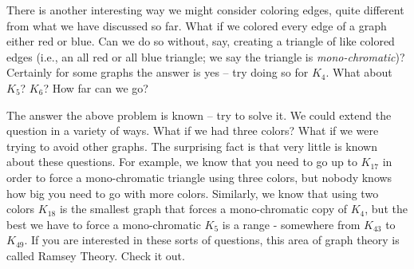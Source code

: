 \documentclass[12pt]{article}
\begin{document}
There is another interesting way we might consider coloring edges, quite different from what we have discussed so far.  What if we colored every edge of a graph either red or blue.  Can we do so without, say, creating a triangle of like colored edges (i.e., an all red or all blue triangle; we say the triangle is {\em mono-chromatic})?  Certainly for some graphs the answer is yes -- try doing so for $K_4$.  What about $K_5$?  $K_6$?  How far can we go?  

The answer the above problem is known -- try to solve it.  We could extend the question in a variety of ways.  What if we had three colors?  What if we were trying to avoid other graphs.  The surprising fact is that very little is known about these questions.  For example, we know that you need to go up to $K_{17}$ in order to force a mono-chromatic triangle using three colors, but nobody knows how big you need to go with more colors.  Similarly, we know that using two colors $K_{18}$ is the smallest graph that forces a mono-chromatic copy of $K_4$, but the best we have to force a mono-chromatic $K_{5}$ is a range - somewhere from $K_{43}$ to $K_{49}$.  If you are interested in these sorts of questions, this area of graph theory is called Ramsey Theory.  Check it out.
\end{document}
